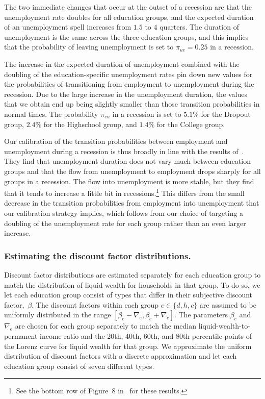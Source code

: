 \documentclass[\latexroot/\projectname]{subfiles}
\begin{document}
The two immediate changes that occur at the outset of a recession are that the unemployment rate doubles for all education groups, and the expected duration of an unemployment spell increases from $1.5$ to $4$ quarters. The duration of unemployment is the same across the three education groups, and this implies that the probability of leaving unemployment is set to $\pi_{ue} = 0.25$ in a recession.

The increase in the expected duration of unemployment combined with the doubling of the education-specific unemployment rates pin down new values for the probabilities of transitioning from employment to unemployment during the recession. Due to the large increase in the unemployment duration, the values that we obtain end up being slightly smaller than those transition probabilities in normal times. The probability $\pi_{eu}$ in a recession is set to $5.1\%$ for the Dropout group, $2.4\%$ for the Highschool group, and $1.4\%$ for the College group.

Our calibration of the transition probabilities between employment and unemployment during a recession is thus broadly in line with the results of~\cite{elsby2010labor}. They find that unemployment duration does not vary much between education groups and that the flow from unemployment to employment drops sharply for all groups in a recession. The flow into unemployment is more stable, but they find that it tends to increase a little bit in recessions.\footnote{See the bottom row of Figure~8 in~\cite{elsby2010labor} for these results.} This differs from the small decrease in the transition probabilities from employment into unemployment that our calibration strategy implies, which follows from our choice of targeting a doubling of the unemployment rate for each group rather than an even larger increase.



\subsubsection{Estimating the discount factor distributions.}
\whenintegrated{\label{sec:estimBetas}}

Discount factor distributions are estimated separately for each education group to match the distribution of liquid wealth for households in that group.
To do so, we let each education group consist of types that differ in their subjective discount factor,~$\beta$.
The discount factors within each group $e\in \{d, h, c\}$ are assumed to be uniformly distributed in the range $[\beta_e-\nabla_e, \beta_e+\nabla_e]$.
The parameters $\beta_e$ and $\nabla_e$ are chosen for each group separately to match the median liquid-wealth-to-permanent-income ratio and the 20th, 40th, 60th, and 80th percentile points of the Lorenz curve for liquid wealth for that group.
We approximate the uniform distribution of discount factors with a discrete approximation and let each education group consist of seven different types.
\end{document}

